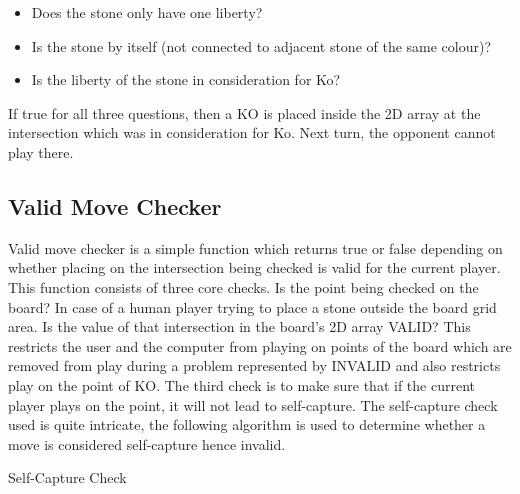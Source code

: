 \documentclass{l4proj}
\begin{document}
\begin{itemize}
    \item Does the stone only have one liberty?
    \item Is the stone by itself (not connected to adjacent stone of the same colour)?
    \item Is the liberty of the stone in consideration for Ko?
\end{itemize}

If true for all three questions, then a KO is placed inside the 2D array at the intersection which was in consideration for Ko. Next turn, the opponent cannot play there.

\subsection{Valid Move Checker}
Valid move checker is a simple function which returns true or false depending on whether placing on the intersection being checked is valid for the current player. This function consists of three core checks. Is the point being checked on the board? In case of a human player trying to place a stone outside the board grid area. Is the value of that intersection in the board’s 2D array VALID? This restricts the user and the computer from playing on points of the board which are removed from play during a problem represented by INVALID and also restricts play on the point of KO. The third check is to make sure that if the current player plays on the point, it will not lead to self-capture. The self-capture check used is quite intricate, the following algorithm is used to determine whether a move is considered self-capture hence invalid.

\begin{algorithm}[H]
\caption{Self-Capture Check}\label{Self-Capture Check}
    \DontPrintSemicolon
\end{algorithm}
\end{document}

